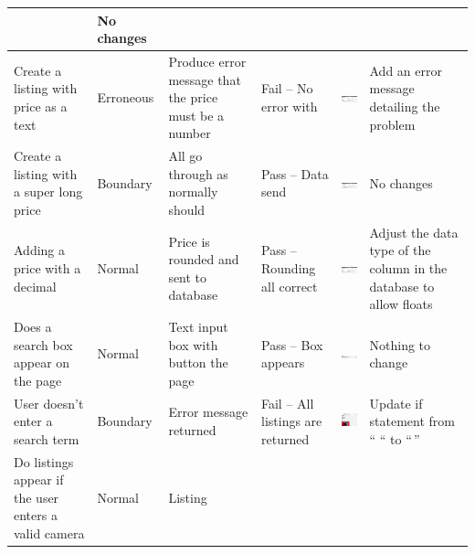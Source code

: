 \begin{center}
\begin{longtable}{|P{17mm}|P{17mm}|P{16mm}|P{17mm}|P{40mm}|P{21.5mm}|}
& No changes \\ \hline
Create a listing with price as a text & Erroneous & Produce error
message that the price must be a number & Fail -- No error with &
\includegraphics[width=38mm]{ch3_developing/proto2/media/image8.png} &
Add an error message detailing the problem \\ \hline
Create a listing with a super long price & Boundary & All go through as
normally should & Pass -- Data send &
\includegraphics[width=38mm]{ch3_developing/proto2/media/image12.png}
& No changes \\ \hline
Adding a price with a decimal & Normal & Price is rounded and sent to
database & Pass -- Rounding all correct &
\includegraphics[width=38mm]{ch3_developing/proto2/media/image8.png} &
Adjust the data type of the column in the database to allow floats \\ \hline
Does a search box appear on the page & Normal & Text input box with
button the page & Pass -- Box appears &
\includegraphics[width=38mm]{ch3_developing/proto2/media/image13.png}
& Nothing to change \\ \hline
User doesn't enter a search term & Boundary & Error message returned &
Fail -- All listings are returned &
\includegraphics[width=38mm]{ch3_developing/proto2/media/image14.png}
& Update if statement from `` `` to ``\,'' \\ \hline
Do listings appear if the user enters a valid camera & Normal & Listing

\end{longtable}
\end{center}
